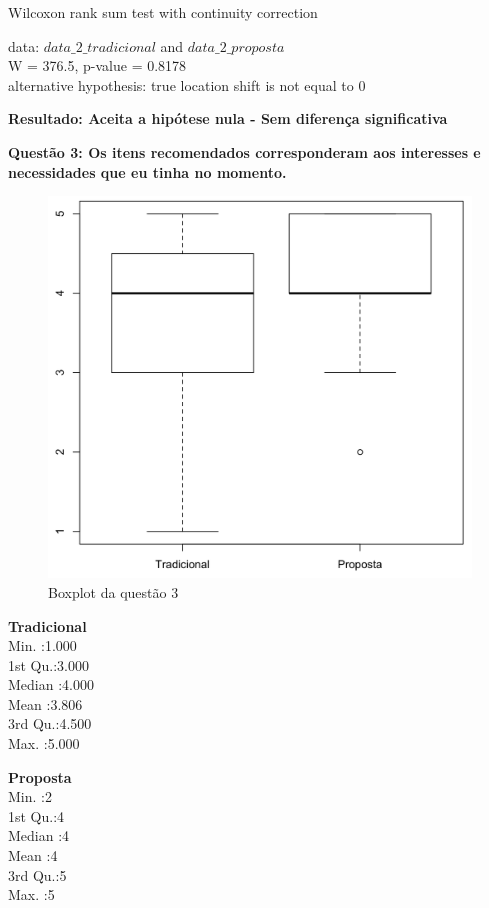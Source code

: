 Wilcoxon rank sum test with continuity correction

\noindent
data:  $data\_2\_tradicional$ and $data\_2\_proposta$\\
W = 376.5, p-value = 0.8178\\
alternative hypothesis: true location shift is not equal to 0

\textbf{Resultado: Aceita a hipótese nula - Sem diferença significativa}

\newpage
\textbf{Questão 3: Os itens recomendados corresponderam aos  interesses e necessidades que eu tinha no momento.}

\begin{figure}[htb]
  \caption{\label{fig:questao3-boxplot}Boxplot da questão 3}
  \begin{center}
      \includegraphics[scale=0.4]{./Figuras/questao3-boxplot.png}
  \end{center}
\end{figure}

\begin{multicols}{2}

\noindent\textbf{Tradicional}\\
Min.   :1.000\\
1st Qu.:3.000\\
Median :4.000\\
Mean   :3.806\\
3rd Qu.:4.500\\
Max.   :5.000\\
\columnbreak

\noindent\textbf{Proposta}\\
Min.   :2\\
1st Qu.:4\\
Median :4\\
Mean   :4\\
3rd Qu.:5\\
Max.   :5
\end{multicols}

